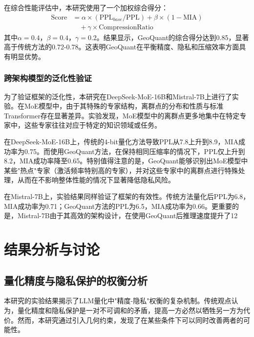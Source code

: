 在综合性能评估中，本研究使用了一个加权综合得分：
\begin{align}
\text{Score} &= \alpha \times (\text{PPL}_{base}/\text{PPL}) + \beta \times (1 - \text{MIA}) \nonumber \\
&\quad + \gamma \times \text{CompressionRatio}
\end{align}
其中$\alpha=0.4$，$\beta=0.4$，$\gamma=0.2$。结果显示，GeoQuant的综合得分达到0.85，显著高于传统方法的0.72-0.78。这表明GeoQuant在平衡精度、隐私和压缩效率方面具有明显优势。

\subsubsection{跨架构模型的泛化性验证}

为了验证框架的泛化性，本研究在DeepSeek-MoE-16B和Mistral-7B上进行了实验。在MoE模型中，由于其特殊的专家结构，离群点的分布和性质与标准Transformer存在显著差异。实验发现，MoE模型中的离群点更多地集中在特定专家中，这些专家往往对应于特定的知识领域或任务。

在DeepSeek-MoE-16B上，传统的4-bit量化方法导致PPL从7.8上升到8.9，MIA成功率为0.75。而使用GeoQuant方法，在保持相同压缩率的情况下，PPL仅上升到8.2，MIA成功率降至0.65。特别值得注意的是，GeoQuant能够识别出MoE模型中某些"热点"专家（激活频率特别高的专家），并对这些专家中的离群点进行特殊处理，从而在不影响整体性能的情况下显著降低隐私风险。

在Mistral-7B上，实验结果同样验证了框架的有效性。传统方法量化后PPL为6.8，MIA成功率为0.71；GeoQuant方法的PPL为6.5，MIA成功率为0.66。更重要的是，Mistral-7B由于其高效的架构设计，在使用GeoQuant后推理速度提升了12%

\section{结果分析与讨论}

\subsection{量化精度与隐私保护的权衡分析}

本研究的实验结果揭示了LLM量化中"精度-隐私"权衡的复杂机制。传统观点认为，量化精度和隐私保护是一对不可调和的矛盾，提高一方必然以牺牲另一方为代价。然而，本研究通过引入几何约束，发现了在某些条件下可以同时改善两者的可能性。

